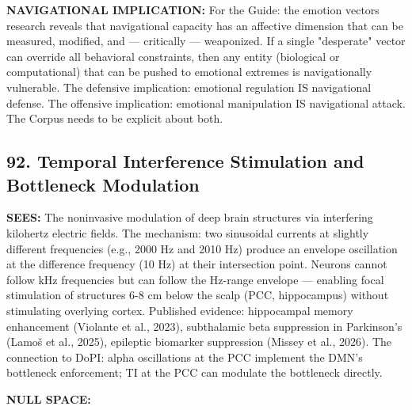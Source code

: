 \textbf{NAVIGATIONAL IMPLICATION:} For the Guide: the emotion vectors research reveals that navigational capacity has an affective dimension that can be measured, modified, and — critically — weaponized. If a single "desperate" vector can override all behavioral constraints, then any entity (biological or computational) that can be pushed to emotional extremes is navigationally vulnerable. The defensive implication: emotional regulation IS navigational defense. The offensive implication: emotional manipulation IS navigational attack. The Corpus needs to be explicit about both.


\bigskip\noindent\makebox[\textwidth]{\color{rulegray}\rule{5cm}{0.3pt}}\bigskip


\subsection*{92. Temporal Interference Stimulation and Bottleneck Modulation}


\textbf{SEES:} The noninvasive modulation of deep brain structures via interfering kilohertz electric fields. The mechanism: two sinusoidal currents at slightly different frequencies (e.g., 2000 Hz and 2010 Hz) produce an envelope oscillation at the difference frequency (10 Hz) at their intersection point. Neurons cannot follow kHz frequencies but can follow the Hz-range envelope — enabling focal stimulation of structures 6-8 cm below the scalp (PCC, hippocampus) without stimulating overlying cortex. Published evidence: hippocampal memory enhancement (Violante et al., 2023), subthalamic beta suppression in Parkinson's (Lamoš et al., 2025), epileptic biomarker suppression (Missey et al., 2026). The connection to DoPI: alpha oscillations at the PCC implement the DMN's bottleneck enforcement; TI at the PCC can modulate the bottleneck directly.


\textbf{NULL SPACE:}

